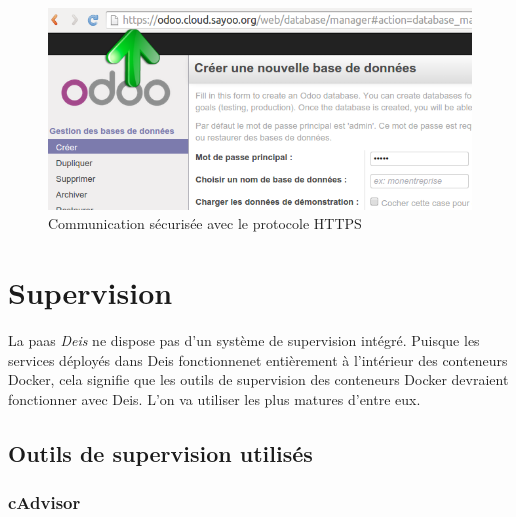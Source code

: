 \begin{onehalfspace}
\begin{figure}[H]
\centering
\includegraphics [scale=0.5]{chapitre5/assets/https}
\caption{Communication sécurisée avec le protocole HTTPS}
\label{fig:https}
\end{figure}


\section{Supervision}

La \acrshort{paas} \emph{Deis} ne dispose pas d'un système de supervision intégré. Puisque les services déployés dans Deis fonctionnenet entièrement à l'intérieur des conteneurs Docker, cela signifie que les outils de supervision des conteneurs Docker devraient fonctionner avec Deis. L'on va utiliser les plus matures d'entre eux.


\subsection{Outils de supervision utilisés}


\subsubsection*{cAdvisor}




\end{onehalfspace}
